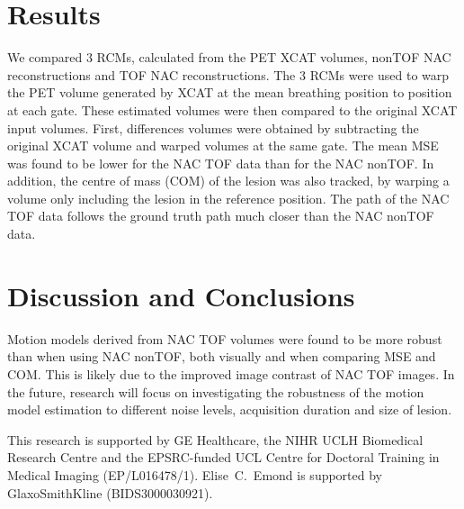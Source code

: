 \documentclass[portrait,color=UCLburgundy,margin=2cm]{uclposter}
\begin{document}
\begin{multicols}{4}
\large

\section*{Results}
We compared $3$ RCMs, calculated from the PET XCAT volumes, nonTOF NAC reconstructions and TOF NAC reconstructions. The $3$ RCMs were used to warp the PET volume generated by XCAT at the mean breathing position to position at each gate. These estimated volumes were then compared to the original XCAT input volumes. First, differences volumes were obtained by subtracting the original XCAT volume and warped volumes at the same gate. The mean MSE was found to be lower for the NAC TOF data than for the NAC nonTOF. In addition, the centre of mass (COM) of the lesion was also tracked, by warping a volume only including the lesion in the reference position. The path of the NAC TOF data follows the ground truth path much closer than the NAC nonTOF data.

\section*{Discussion and Conclusions}
Motion models derived from NAC TOF volumes were found to be more robust than when using NAC nonTOF, both visually and when comparing MSE and COM. This is likely due to the improved image contrast of NAC TOF images. In the future, research will focus on investigating the robustness of the motion model estimation to different noise levels, acquisition duration and size of lesion.

\AtNextBibliography{\small}
\printbibliography

This research is supported by GE Healthcare, the NIHR UCLH Biomedical Research Centre and the EPSRC-funded UCL Centre for Doctoral Training in Medical Imaging (EP/L016478/1).
Elise~C.~Emond is supported by GlaxoSmithKline (BIDS3000030921).

\end{multicols}
\end{document}
